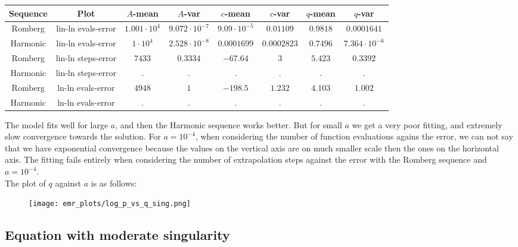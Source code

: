 \begin{table}[H]
    \centering
    \small
     \begin{tabular}{c|c||c|c|c|c|c|c}
Sequence & Plot & \(A\)-mean & \(A\)-var & \(c\)-mean & \(c\)-var & \(q\)-mean & \(q\)-var\\\hline
Romberg & lin-ln evals-error & \(1.001\cdot 10^{4}\) & \(9.072\cdot 10^{-7}\) & \(9.09\cdot 10^{-5}\) & \(0.01109\) & \(0.9818\) & \(0.0001641\) \\
Harmonic & lin-ln evals-error & \(1\cdot 10^{4}\) & \(2.528\cdot 10^{-8}\) & \(0.0001699\) & \(0.0002823\) & \(0.7496\) & \(7.364\cdot 10^{-6}\) \\
Romberg & lin-ln steps-error & \(7433\) & \(0.3334\) & \(-67.64\) & \(3\) & \(5.423\) & \(0.3392\) \\
Harmonic & lin-ln steps-error & . & . & . & . & . & . \\
Romberg & ln-ln evals-error & \(4948\) & \(1\) & \(-198.5\) & \(1.232\) & \(4.103\) & \(1.002\) \\
Harmonic & ln-ln evals-error & . & . & . & . & . & . \\
    \end{tabular}
    \label{tab:my_label}
\end{table}

The model fits well for large \(a\), and then the Harmonic sequence works better. But for small \(a\) we get a very poor fitting, and extremely slow convergence towards the solution. For \(a = 10^{-4}\), when considering the number of function evaluations agains the error, we can not say that we have exponential convergence because the values on the vertical axis are on much smaller scale then the ones on the horizontal axis. The fitting fails entirely when considering the number of extrapolation steps against the error with the Romberg sequence and \(a = 10^{-4}\).\\

The plot of \(q\) against \(a\) is as follows:

\begin{figure}[H]
\centering
\begin{minipage}{0.45\textwidth}
\centering
\texttt{[image: emr\_plots/log\_p\_vs\_q\_sing.png]}
\end{minipage}
\end{figure}

\subsection{Equation with moderate singularity}


